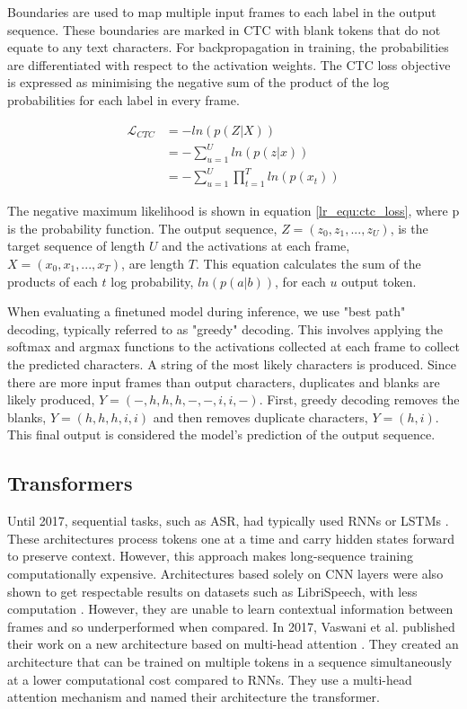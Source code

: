 Boundaries are used to map multiple input frames to each label in the output sequence. These boundaries are marked in CTC with blank tokens that do not equate to any text characters. For backpropagation in training, the probabilities are differentiated with respect to the activation weights. The CTC loss objective is expressed as minimising the negative sum of the product of the log probabilities for each label in every frame.

\begin{equation}\label{lr_equ:ctc_loss}
\begin{split}
    \mathcal{L}_{CTC}&= -ln(p(Z|X)) \\
                     &=-\sum^U_{u=1} ln(p(z|x))\\
                     &=-\sum^U_{u=1} \prod_{t=1}^T ln(p(x_t)) 
\end{split}
\end{equation}

The negative maximum likelihood is shown in equation \ref{lr_equ:ctc_loss}, where p is the probability function. The output sequence, $Z=(z_0,z_1,...,z_U)$, is the target sequence of length $U$ and the activations at each frame, $X=(x_0,x_1,...,x_T)$, are length $T$. This equation calculates the sum of the products of each $t$ log probability, $ln(p(a|b))$, for each $u$ output token. 

When evaluating a finetuned model during inference, we use "best path" decoding, typically referred to as "greedy" decoding. This involves applying the softmax and argmax functions to the activations collected at each frame to collect the predicted characters. A string of the most likely characters is produced. Since there are more input frames than output characters, duplicates and blanks are likely produced, $Y=(-,h,h,h,-,-,i,i,-)$. First, greedy decoding removes the blanks, $Y=(h,h,h,i,i)$ and then removes duplicate characters, $Y=(h,i)$. This final output is considered the model's prediction of the output sequence.




\subsection{Transformers}

Until 2017, sequential tasks, such as ASR, had typically used RNNs or LSTMs \cite{graves2012rnnt}. These architectures process tokens one at a time and carry hidden states forward to preserve context. However, this approach makes long-sequence training computationally expensive. Architectures based solely on CNN layers were also shown to get respectable results on datasets such as LibriSpeech, with less computation \cite{librispeech, quartznet}. However, they are unable to learn contextual information between frames and so underperformed when compared. In 2017, Vaswani et al. \cite{vaswani2017attention} published their work on a new architecture based on multi-head attention \cite{bahdanau2014neural, luong2015effective}. They created an architecture that can be trained on multiple tokens in a sequence simultaneously at a lower computational cost compared to RNNs. They use a multi-head attention mechanism and named their architecture the transformer.

